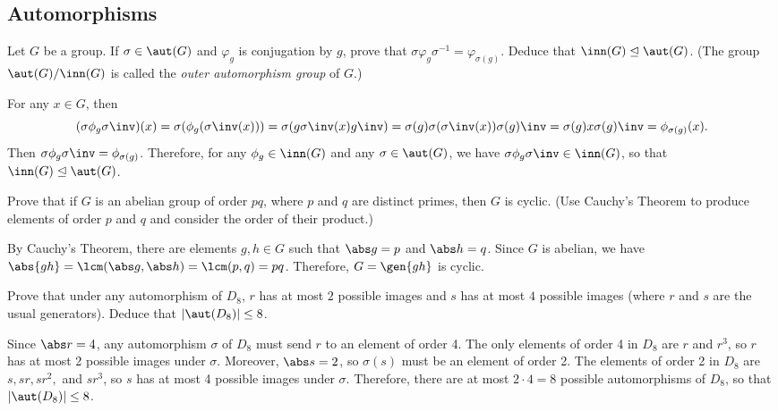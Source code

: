 \newpage

\subsection{Automorphisms}

\begin{specialexercise}
	Let $G$ be a group. If $\sigma \in \aut(G)$ and $\varphi_g$ is conjugation by $g$, prove that $\sigma \varphi_g \sigma^{-1} = \varphi_{\sigma(g)}$. Deduce that $\inn(G) \trianglelefteq \aut(G)$. (The group $\aut(G)/\inn(G)$ is called the \emph{outer automorphism group} of $G$.)
\end{specialexercise}

\begin{sol}
	For any $x \in G$, then
	\[(\sigma\phi_g\sigma\inv)(x) = \sigma(\phi_g(\sigma\inv(x))) = \sigma(g\sigma\inv(x)g\inv) = \sigma(g)\sigma(\sigma\inv(x))\sigma(g)\inv = \sigma(g)x\sigma(g)\inv = \phi_{\sigma(g)}(x).\]
	Then $\sigma\phi_g\sigma\inv = \phi_{\sigma(g)}$. Therefore, for any $\phi_g \in \inn(G)$ and any $\sigma \in \aut(G)$, we have $\sigma\phi_g\sigma\inv \in \inn(G)$, so that $\inn(G) \trianglelefteq \aut(G)$.
\end{sol}

\begin{specialexercise}
	Prove that if $G$ is an abelian group of order $pq$, where $p$ and $q$ are distinct primes, then $G$ is cyclic. (Use Cauchy's Theorem to produce elements of order $p$ and $q$ and consider the order of their product.)
\end{specialexercise}

\begin{sol}
	By Cauchy's Theorem, there are elements $g, h \in G$ such that $\abs g = p$ and $\abs h = q$. Since $G$ is abelian, we have $\abs{gh} = \lcm(\abs g, \abs h) = \lcm(p, q) = pq$. Therefore, $G = \gen{gh}$ is cyclic.
\end{sol}

\begin{exercise}
	\label{ex4.4.3} Prove that under any automorphism of $D_8$, $r$ has at most $2$ possible images and $s$ has at most $4$ possible images (where $r$ and $s$ are the usual generators). Deduce that $|\aut(D_8)| \le 8$.
\end{exercise}

\begin{sol}
	Since $\abs r = 4$, any automorphism $\sigma$ of $D_8$ must send $r$ to an element of order 4. The only elements of order 4 in $D_8$ are $r$ and $r^3$, so $r$ has at most 2 possible images under $\sigma$. Moreover, $\abs s = 2$, so $\sigma(s)$ must be an element of order 2. The elements of order 2 in $D_8$ are $s, sr, sr^2,$ and $sr^3$, so $s$ has at most 4 possible images under $\sigma$. Therefore, there are at most $2 \cdot 4 = 8$ possible automorphisms of $D_8$, so that $|\aut(D_8)| \leq 8$.
\end{sol}

